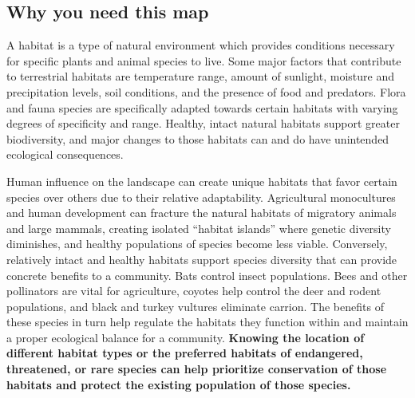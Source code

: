 \subsection*{Why you need this map}
A habitat is a type of natural environment which provides conditions necessary 
for specific plants and animal species to live. Some major factors that 
contribute to terrestrial habitats are temperature range, amount of sunlight, 
moisture and precipitation levels, soil conditions, and the presence of food 
and predators. Flora and fauna species are specifically adapted towards certain 
habitats with varying degrees of specificity and range. Healthy, intact natural 
habitats support greater biodiversity, and major changes to those habitats can 
and do have unintended ecological consequences.
\par
Human influence on the landscape can create unique habitats that favor certain
species over others due to their relative adaptability. Agricultural
monocultures and human development can fracture the natural habitats of
migratory animals and large mammals, creating isolated “habitat islands” where
genetic diversity diminishes, and healthy populations of species become less
viable. Conversely, relatively intact and healthy habitats support species
diversity that can provide concrete benefits to a community. Bats control
insect populations. Bees and other pollinators are vital for agriculture,
coyotes help control the deer and rodent populations, and black and turkey
vultures eliminate carrion. The benefits of these species in turn help regulate
the habitats they function within and maintain a proper ecological balance for
a community. \textbf{Knowing the location of different habitat types or the preferred
habitats of endangered, threatened, or rare species can help prioritize
conservation of those habitats and protect the existing population of those
species.}
